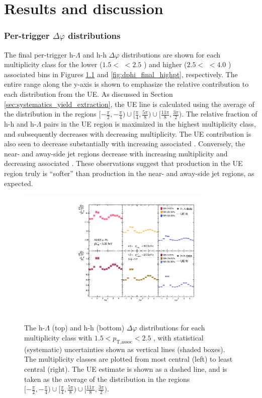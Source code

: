 \chapter{Results and discussion}
\label{chapter_results}

\subsection{Per-trigger $\Delta\varphi$ distributions}

The final per-trigger h-$\Lambda$ and h-h $\Delta\varphi$ distributions are shown for each multiplicity class for the lower ($1.5 <$ \pt $< 2.5$ \GeVc) and higher ($2.5 < $ \pt $< 4.0$ \GeVc) associated \pt bins in Figures \ref{fig:dphi_final_lowpt} and \ref{fig:dphi_final_highpt}, respectively. The entire range along the y-axis is shown to emphasize the relative contribution to each distribution from the UE. As discussed in Section \ref{sec:systematics_yield_extraction}, the UE line is calculated using the average of the distribution in the regions $[-\frac{\pi}{2}, -\frac{\pi}{4}) \cup [\frac{\pi}{4}, \frac{5\pi}{8}) \cup [\frac{11\pi}{8}, \frac{3\pi}{2})$. The relative fraction of h-h and h-$\Lambda$ pairs in the UE region is maximized in the highest multiplicity class, and subsequently decreases with decreasing multiplicity. The UE contribution is also seen to decrease substantially with increasing associated \pt. Conversely, the near- and away-side jet regions decrease with increasing multiplicity and decreasing associated \pt. These observations suggest that production in the UE region truly is ``softer'' than production in the near- and away-side jet regions, as expected.

\begin{figure}[h!]
\centering
\includegraphics[width=0.83\textwidth]{figures/results/dphi_final_lowpt.pdf}
\caption{The h-$\Lambda$ (top) and h-h (bottom) $\Delta\varphi$ distributions for each multiplicity class with $1.5 < p_{\text{T,assoc}} < 2.5$ \GeVc, with statistical (systematic) uncertainties shown as vertical lines (shaded boxes). The multiplicity classes are plotted from most central (left) to least central (right). The UE estimate is shown as a dashed line, and is taken as the average of the distribution in the regions $[-\frac{\pi}{2}, -\frac{\pi}{4}) \cup [\frac{\pi}{4}, \frac{5\pi}{8}) \cup [\frac{11\pi}{8}, \frac{3\pi}{2})$.}
\label{fig:dphi_final_lowpt}
\end{figure}

